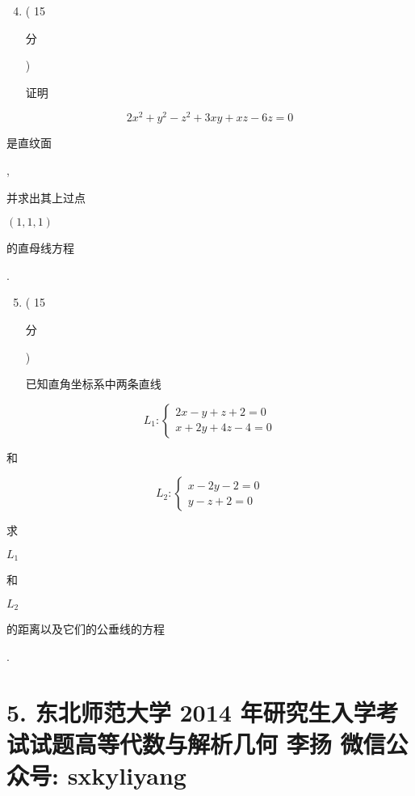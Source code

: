 \documentclass[10pt]{article}
\begin{document}
\begin{enumerate}
  \setcounter{enumi}{3}
  \item ( 15 \begin{CJK}{UTF8}{mj}分\end{CJK}) \begin{CJK}{UTF8}{mj}证明\end{CJK}
\end{enumerate}
$$
2 x^{2}+y^{2}-z^{2}+3 x y+x z-6 z=0
$$
\begin{CJK}{UTF8}{mj}是直纹面\end{CJK}, \begin{CJK}{UTF8}{mj}并求出其上过点\end{CJK} $(1,1,1)$ \begin{CJK}{UTF8}{mj}的直母线方程\end{CJK}.

\begin{enumerate}
  \setcounter{enumi}{4}
  \item ( 15 \begin{CJK}{UTF8}{mj}分\end{CJK}) \begin{CJK}{UTF8}{mj}已知直角坐标系中两条直线\end{CJK}
\end{enumerate}
$$
L_{1}:\left\{\begin{array}{l}
2 x-y+z+2=0 \\
x+2 y+4 z-4=0
\end{array}\right.
$$
\begin{CJK}{UTF8}{mj}和\end{CJK}
$$
L_{2}:\left\{\begin{array}{l}
x-2 y-2=0 \\
y-z+2=0
\end{array}\right.
$$
\begin{CJK}{UTF8}{mj}求\end{CJK} $L_{1}$ \begin{CJK}{UTF8}{mj}和\end{CJK} $L_{2}$ \begin{CJK}{UTF8}{mj}的距离以及它们的公垂线的方程\end{CJK}.

\section{5. 东北师范大学 2014 年研究生入学考试试题高等代数与解析几何 
 李扬 
 微信公众号: sxkyliyang}
\end{document}

